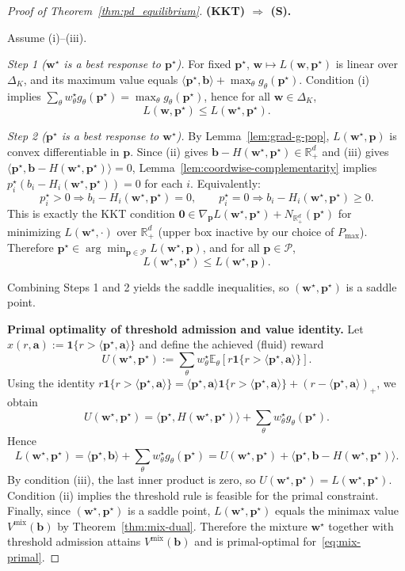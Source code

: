 \documentclass[10pt,a4paper]{amsart}
\newcommand{\E}{\mathbb{E}}
\newcommand{\R}{\mathbb{R}}
\newcommand{\ba}{\mathbf{a}}
\newcommand{\bb}{\mathbf{b}}
\newcommand{\bp}{\mathbf{p}}
\newcommand{\bw}{\mathbf{w}}
\newcommand{\cP}{\mathcal{P}}
\begin{document}
\begin{proof}[Proof of Theorem~\ref{thm:pd_equilibrium}]
\textbf{(KKT) $\Rightarrow$ (S).}

Assume (i)--(iii).

\emph{Step 1 ($\bw^\star$ is a best response to $\bp^\star$).}
For fixed $\bp^\star$, $\bw \mapsto L(\bw, \bp^\star)$ is linear over $\Delta_K$, and its maximum value equals $\langle \bp^\star, \bb \rangle + \max_{\theta} g_\theta(\bp^\star)$.
Condition (i) implies $\sum_\theta w_\theta^\star g_\theta(\bp^\star) = \max_{\theta} g_\theta(\bp^\star)$, hence for all $\bw \in \Delta_K$,
\[
L(\bw, \bp^\star) \le L(\bw^\star, \bp^\star).
\]

\emph{Step 2 ($\bp^\star$ is a best response to $\bw^\star$).}
By Lemma~\ref{lem:grad-g-pop}, $L(\bw^\star, \bp)$ is convex differentiable in $\bp$.
Since (ii) gives $\bb - H(\bw^\star, \bp^\star) \in \R_+^d$ and (iii) gives $\langle \bp^\star, \bb - H(\bw^\star, \bp^\star) \rangle = 0$, Lemma~\ref{lem:coordwise-complementarity} implies $p_i^\star(b_i - H_i(\bw^\star, \bp^\star)) = 0$ for each $i$.
Equivalently:
\[
p_i^\star > 0 \Rightarrow b_i - H_i(\bw^\star, \bp^\star) = 0, \qquad p_i^\star = 0 \Rightarrow b_i - H_i(\bw^\star, \bp^\star) \ge 0.
\]
This is exactly the KKT condition $\mathbf{0} \in \nabla_\bp L(\bw^\star, \bp^\star) + N_{\R_+^d}(\bp^\star)$ for minimizing $L(\bw^\star, \cdot)$ over $\R_+^d$ (upper box inactive by our choice of $P_{\max}$).
Therefore $\bp^\star \in \arg\min_{\bp \in \cP} L(\bw^\star, \bp)$, and for all $\bp \in \cP$,
\[
L(\bw^\star, \bp^\star) \le L(\bw^\star, \bp).
\]

Combining Steps 1 and 2 yields the saddle inequalities, so $(\bw^\star, \bp^\star)$ is a saddle point.

\textbf{Primal optimality of threshold admission and value identity.}
Let $x(r, \ba) := \mathbf{1}\{r > \langle \bp^\star, \ba \rangle\}$ and define the achieved (fluid) reward
\[
U(\bw^\star, \bp^\star) := \sum_\theta w_\theta^\star \E_\theta\!\left[r \mathbf{1}\{r > \langle \bp^\star, \ba \rangle\}\right].
\]
Using the identity $r \mathbf{1}\{r > \langle \bp^\star, \ba \rangle\} = \langle \bp^\star, \ba \rangle \mathbf{1}\{r > \langle \bp^\star, \ba \rangle\} + (r - \langle \bp^\star, \ba \rangle)_+$, we obtain
\[
U(\bw^\star, \bp^\star) = \langle \bp^\star, H(\bw^\star, \bp^\star) \rangle + \sum_\theta w_\theta^\star g_\theta(\bp^\star).
\]
Hence
\[
L(\bw^\star, \bp^\star) = \langle \bp^\star, \bb \rangle + \sum_\theta w_\theta^\star g_\theta(\bp^\star) = U(\bw^\star, \bp^\star) + \langle \bp^\star, \bb - H(\bw^\star, \bp^\star) \rangle.
\]
By condition (iii), the last inner product is zero, so $U(\bw^\star, \bp^\star) = L(\bw^\star, \bp^\star)$.
Condition (ii) implies the threshold rule is feasible for the primal constraint.
Finally, since $(\bw^\star, \bp^\star)$ is a saddle point, $L(\bw^\star, \bp^\star)$ equals the minimax value $V^{\mathrm{mix}}(\bb)$ by Theorem~\ref{thm:mix-dual}. Therefore the mixture $\bw^\star$ together with threshold admission attains $V^{\mathrm{mix}}(\bb)$ and is primal-optimal for~\eqref{eq:mix-primal}.
\end{proof}
\end{document}
